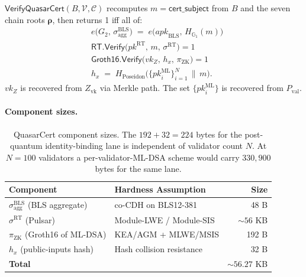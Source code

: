 \begin{definition}
\label{def:verify-qcert}
$\mathsf{VerifyQuasarCert}(B, \mathcal{V}, \mathcal{C})$ recomputes
$m = \mathsf{cert\_subject}$ from $B$ and the seven chain roots
$\boldsymbol{\rho}$, then returns 1 iff all of:
\begin{align}
&e\bigl(G_2,\, \sigma^{\mathrm{BLS}}_{\mathrm{agg}}\bigr) \;=\;
  e\bigl(\mathit{apk}_{\mathrm{BLS}},\, H_{\mathbb{G}_1}(m)\bigr)
  \label{eq:v-bls} \\
&\mathsf{RT.Verify}\bigl(\mathit{pk}^{\mathrm{RT}},\, m,\,
  \sigma^{\mathrm{RT}}\bigr) = 1 \label{eq:v-rt} \\
&\mathsf{Groth16.Verify}\bigl(\mathit{vk}_{Z},\, h_x,\, \pi_{\mathrm{ZK}}\bigr)
  = 1 \label{eq:v-zk} \\
&h_x \;=\; H_{\text{Poseidon}}\bigl(\{\mathit{pk}_i^{\mathrm{ML}}\}_{i=1}^N
  \,\|\, m\bigr). \label{eq:v-hx}
\end{align}
$\mathit{vk}_Z$ is recovered from $Z_\text{vk}$ via Merkle path. The set
$\{\mathit{pk}_i^{\mathrm{ML}}\}$ is recovered from $P_\text{val}$.
\end{definition}

\paragraph{Component sizes.}

\begin{table}[ht]
\centering
\begin{tabular}{@{}llr@{}}
\toprule
\textbf{Component} & \textbf{Hardness Assumption} & \textbf{Size} \\
\midrule
$\sigma^{\mathrm{BLS}}_{\mathrm{agg}}$ (BLS aggregate) &
  co-CDH on BLS12-381 & 48 B \\
$\sigma^{\mathrm{RT}}$ (Pulsar) &
  Module-LWE / Module-SIS & ${\sim}56$ KB \\
$\pi_{\mathrm{ZK}}$ (Groth16 of ML-DSA) &
  KEA/AGM + MLWE/MSIS & 192 B \\
$h_x$ (public-inputs hash) & Hash collision resistance & 32 B \\
\midrule
\textbf{Total} & & ${\sim}56.27$ KB \\
\bottomrule
\end{tabular}
\caption{QuasarCert component sizes. The $192 + 32 = 224$ bytes for the
post-quantum identity-binding lane is independent of validator count
$N$. At $N{=}100$ validators a per-validator-ML-DSA scheme would carry
$330{,}900$ bytes for the same lane.}
\label{tab:cert-sizes}
\end{table}

